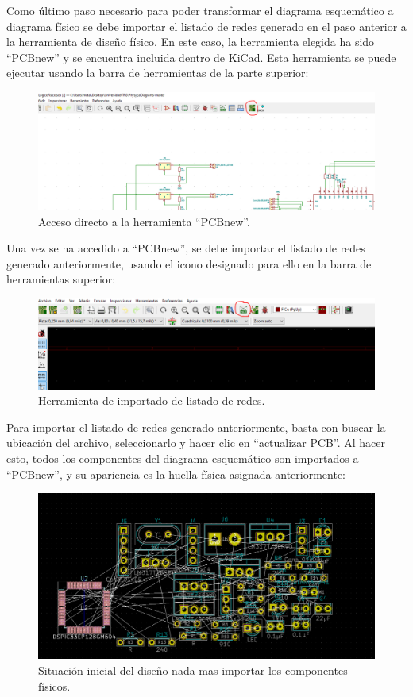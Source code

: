 Como último paso necesario para poder transformar el diagrama esquemático a diagrama físico se debe importar el listado de redes generado en el paso anterior a la herramienta de diseño físico. En este caso, la herramienta elegida ha sido ``PCBnew'' y se encuentra incluida dentro de KiCad. Esta herramienta se puede ejecutar usando la barra de herramientas de la parte superior:

\begin{figure}[H]
\centering 
\includegraphics[width=0.9\linewidth]{pictures/PCBNEW.PNG}
\caption{Acceso directo a la herramienta ``PCBnew''.}
\label{fig:CAMBIAR!!!!!!!!!!}
\end{figure}

Una vez se ha accedido a ``PCBnew'', se debe importar el listado de redes generado anteriormente, usando el icono designado para ello en la barra de herramientas superior:

\begin{figure}[H]
\centering 
\includegraphics[width=0.9\linewidth]{pictures/redesPCB.PNG}
\caption{Herramienta de importado de listado de redes.}
\label{fig:CAMBIAR!!!!!!!!!!}
\end{figure}

Para importar el listado de redes generado anteriormente, basta con buscar la ubicación del archivo, seleccionarlo y hacer clic en ``actualizar PCB''. Al hacer esto, todos los componentes del diagrama esquemático son importados a ``PCBnew'', y su apariencia es la huella física asignada anteriormente:

\begin{figure}[H]
\centering 
\includegraphics[width=0.9\linewidth]{pictures/bunch.PNG}
\caption{Situación inicial del diseño nada mas importar los componentes físicos.}
\label{fig:CAMBIAR!!!!!!!!!!}
\end{figure}

